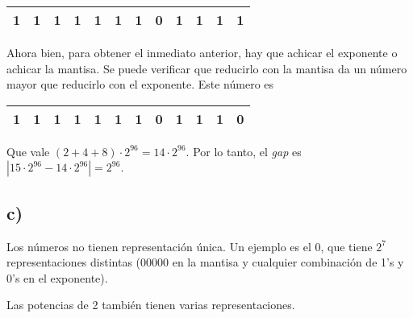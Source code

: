 \documentclass[hidelinks,a4paper,10pt, nofootinbib]{article}
\begin{document}
\begin{center}
\begin{tabular}{|c|c|c|c|c|c|c||c|c|c|c|c|}
\hline
1&1&1&1&1&1&1&0&1&1&1&1\\
\hline
\end{tabular}
\end{center}

Ahora bien, para obtener el inmediato anterior, hay que achicar el exponente o achicar la mantisa. Se puede verificar que reducirlo con la mantisa da un número mayor que reducirlo con el exponente. Este número es

\begin{center}
\begin{tabular}{|c|c|c|c|c|c|c||c|c|c|c|c|}
\hline
1&1&1&1&1&1&1&0&1&1&1&0\\
\hline
\end{tabular}
\end{center}

Que vale $(2+4+8) \cdot 2^{96} = 14 \cdot 2^{96}$. Por lo tanto, el \emph{gap} es $|15 \cdot 2^{96} - 14 \cdot 2^{96}| = 2^{96}$.

\subsection*{c)}
Los números no tienen representación única. Un ejemplo es el 0, que tiene $2^7$ representaciones distintas ($00000$ en la mantisa y cualquier combinación de 1's y 0's en el exponente).

Las potencias de 2 también tienen varias representaciones.
\end{document}
